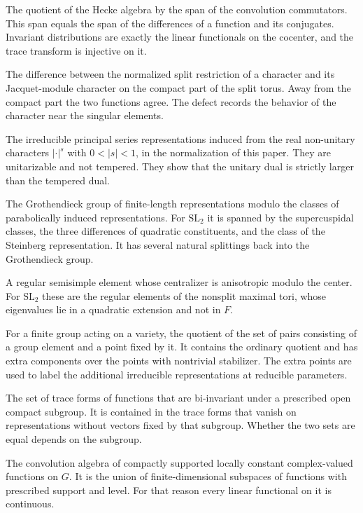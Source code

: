 \documentclass[12pt,letterpaper]{amsart}
\numberwithin{equation}{section}
\theoremstyle{definition}
\theoremstyle{remark}
\begin{document}
\begin{description}[style=nextline,leftmargin=1em]
\item[Cocenter] The quotient of the Hecke algebra by the span of the convolution commutators. This span equals the span of the differences of a function and its conjugates. Invariant distributions are exactly the linear functionals on the cocenter, and the trace transform is injective on it.
\item[Compact defect] The difference between the normalized split restriction of a character and its Jacquet-module character on the compact part of the split torus. Away from the compact part the two functions agree. The defect records the behavior of the character near the singular elements.
\item[Complementary series] The irreducible principal series representations induced from the real non-unitary characters $|\cdot|^s$ with $0<|s|<1$, in the normalization of this paper. They are unitarizable and not tempered. They show that the unitary dual is strictly larger than the tempered dual.
\item[Elliptic quotient] The Grothendieck group of finite-length representations modulo the classes of parabolically induced representations. For $\mathrm{SL}_2$ it is spanned by the supercuspidal classes, the three differences of quadratic constituents, and the class of the Steinberg representation. It has several natural splittings back into the Grothendieck group.
\item[Elliptic regular element] A regular semisimple element whose centralizer is anisotropic modulo the center. For $\mathrm{SL}_2$ these are the regular elements of the nonsplit maximal tori, whose eigenvalues lie in a quadratic extension and not in $F$.
\item[Extended quotient] For a finite group acting on a variety, the quotient of the set of pairs consisting of a group element and a point fixed by it. It contains the ordinary quotient and has extra components over the points with nontrivial stabilizer. The extra points are used to label the additional irreducible representations at reducible parameters.
\item[Fixed-level trace image] The set of trace forms of functions that are bi-invariant under a prescribed open compact subgroup. It is contained in the trace forms that vanish on representations without vectors fixed by that subgroup. Whether the two sets are equal depends on the subgroup.
\item[Hecke algebra] The convolution algebra of compactly supported locally constant complex-valued functions on $G$. It is the union of finite-dimensional subspaces of functions with prescribed support and level. For that reason every linear functional on it is continuous.

\end{description}
\end{document}
